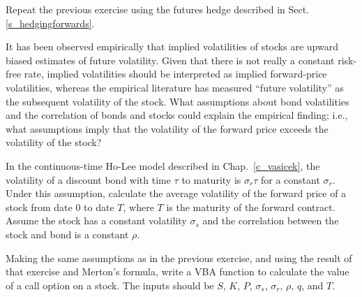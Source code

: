 \begin{prob}
\end{prob}\begin{prob} Repeat the previous exercise using the futures hedge described in Sect. \ref{s_hedgingforwards}.
\end{prob}\begin{prob} It has been observed empirically that implied volatilities of stocks are upward biased estimates of future volatility.  Given that there is not really a constant risk-free rate, implied volatilities should be interpreted as implied forward-price volatilities, whereas the empirical literature has measured ``future volatility'' as the subsequent volatility of the stock.  What assumptions about bond volatilities and the correlation of bonds and stocks could explain the empirical finding; i.e., what assumptions imply that the volatility of the forward price exceeds the volatility of the stock?
\end{prob}\begin{prob} In the continuous-time Ho-Lee model described in Chap.~\ref{c_vasicek}, the volatility of a discount bond with time $\tau$ to maturity is $\sigma_r\tau$ for a constant $\sigma_r$.  Under this assumption, calculate the average volatility of the forward price of a stock from date 0 to date $T$, where $T$ is the maturity of the forward contract.  Assume the stock has a constant volatility $\sigma_s$ and the correlation between the stock and bond is a constant $\rho$.
\end{prob}\begin{prob} Making the same assumptions as in the previous exercise, and using the result of that exercise and Merton's formula, write a VBA function to calculate the value of a call option on a stock.  The inputs should be $S$, $K$, $P$, $\sigma_s$, $\sigma_r$, $\rho$, $q$, and $T$.
\end{prob}
